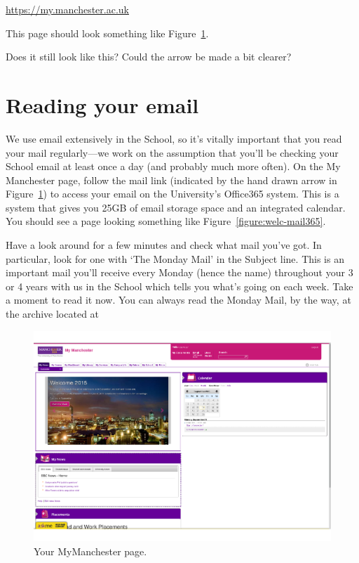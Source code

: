 \url{https://my.manchester.ac.uk}

This page should look something like Figure~\ref{figure:welc-mymanchester}.

\begin{demonote}
Does it still look like this? Could the arrow be made a bit clearer?
\end{demonote}
\section{Reading your email}

We use email extensively in the School, so it's vitally important that
you read your mail regularly---we work on the assumption that you'll be checking your School email at least once a day (and probably much
more often). On the My Manchester page, follow the mail link (indicated by the hand drawn arrow  in
Figure~\ref{figure:welc-mymanchester}) to access your email on the
University's Office365 system. This is a system that
gives you 25GB of email storage space and an integrated calendar. You should
see a page looking something like Figure~\ref{figure:welc-mail365}.

Have a look around for a few minutes and check what mail you've
got. In particular, look for one with `The Monday Mail' in the
Subject line. This is an important mail you'll receive every Monday
(hence the name) throughout your 3 or 4 years with us in the
School which  tells you what's going on each week. Take a moment to read it now. You can always read the Monday Mail, by the way, at the archive located at\\  

\begin{figure}
\centerline{\includegraphics[width=15cm]{images/mymanchester.pdf}}
\caption{Your MyManchester page.}
\label{figure:welc-mymanchester}
\end{figure}

